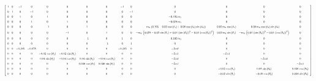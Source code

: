 \begin{equation}\label{MatrixA}\scalemath{0.4}{
 \left[ \begin {array}{cccccccccccccc} 1&0&-1&0&0&0&0&0&-1&0&0&0&0&0
\\ \noalign{\medskip}0&1&0&-1&0&0&0&0&0&-1&0&0&0&0
\\ \noalign{\medskip}0&0&1&0&1&0&0&0&0&0&- 0.195\,m_{1}&0&0&0
\\ \noalign{\medskip}0&0&0&1&0&1&0&0&0&0&- 0.078\,m_{1}&0&0&0
\\ \noalign{\medskip}0&0&0&0&-1&0&1&0&0&0&-m_{2}\, \left(  0.195- 0.02
\,\cos \left( \theta_{1} \right) + 0.08\,\cos \left( \theta_{2}
 \right) \sin \left( \theta_{2} \right)  \right) & 0.02\,m_{2}\,\cos
 \left( \theta_{1} \right) &- 0.08\,m_{2}\,\cos \left( \theta_{2}
 \right) \sin \left( \theta_{2} \right) &0\\ \noalign{\medskip}0&0&0&0
&0&-1&0&1&0&0&-m_{2}\, \left(  0.078- 0.02\,\sin \left( \theta_{1}
 \right) + 0.04\, \left( \sin \left( \theta_{2} \right)  \right) ^{2}-
 0.04\, \left( \cos \left( \theta_{2} \right)  \right) ^{2} \right) &
 0.02\,m_{2}\,\sin \left( \theta_{1} \right) &-m_{2}\, \left(  0.04\,
 \left( \sin \left( \theta_{2} \right)  \right) ^{2}- 0.04\, \left( 
\cos \left( \theta_{2} \right)  \right) ^{2} \right) &0
\\ \noalign{\medskip}0&0&0&0&0&0&-1&0&1&0&- 0.195\,m_{3}&0&0&0
\\ \noalign{\medskip}0&0&0&0&0&0&0&-1&0&1&0&0&0&0\\ \noalign{\medskip}0
&0&- 0.195&- 0.078&0&0&0&0&- 0.195&0&-{\it Izz0}&0&0&0
\\ \noalign{\medskip}0&0&0&0&- 0.02\,\cos \left( \theta_{1} \right) &-
 0.02\,\sin \left( \theta_{1} \right) &0&0&0&0&-{\it Izz1}&-{\it Izz1}
&0&0\\ \noalign{\medskip}0&0&0&0& 0.04\,\sin \left( \theta_{2}
 \right) &- 0.04\,\cos \left( \theta_{2} \right) & 0.04\,\sin \left( 
\theta_{2} \right) &- 0.04\,\cos \left( \theta_{2} \right) &0&0&-{\it 
Izz2}&0&-{\it Izz2}&0\\ \noalign{\medskip}0&0&0&0&0&0& 0.036\,\cos
 \left( \theta_{3} \right) & 0.036\,\sin \left( \theta_{3} \right) &0&0
&-{\it Izz3}&0&0&-{\it Izz3}\\ \noalign{\medskip}0&0&0&0&0&0&0&0&0&0&0
&- 0.02\,\cos \left( \theta_{1} \right) & 0.08\,\sin \left( \theta_{2}
 \right) & 0.036\,\cos \left( \theta_{3} \right) \\ \noalign{\medskip}0
&0&0&0&0&0&0&0&0&0&0&- 0.02\,\sin \left( \theta_{1} \right) &- 0.08\,
\cos \left( \theta_{2} \right) & 0.036\,\sin \left( \theta_{3}
 \right) \end {array} \right] 
 }
\end{equation}

